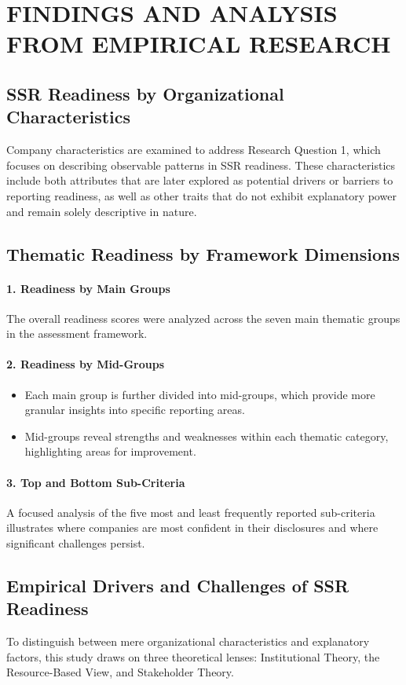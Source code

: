 \chapter{FINDINGS AND ANALYSIS FROM EMPIRICAL RESEARCH}

\section{SSR Readiness by Organizational Characteristics}
Company characteristics are examined to address Research Question 1, which focuses on describing observable patterns 
in SSR readiness. These characteristics include both attributes that are later explored as potential 
drivers or barriers to reporting readiness, as well as other traits that do not exhibit explanatory power 
and remain solely descriptive in nature.

\section{Thematic Readiness by Framework Dimensions}
\subsubsection{1. Readiness by Main Groups}
The overall readiness scores were analyzed across the seven main thematic groups in the assessment framework.

\subsubsection{2. Readiness by Mid-Groups}
\begin{itemize}
    \item Each main group is further divided into mid-groups, which provide more granular insights into specific reporting areas.
    \item Mid-groups reveal strengths and weaknesses within each thematic category, highlighting areas for improvement.
\end{itemize}

\subsubsection{3. Top and Bottom Sub-Criteria}
A focused analysis of the five most and least frequently reported sub-criteria illustrates 
where companies are most confident in their disclosures and where significant challenges persist. 

\section{Empirical Drivers and Challenges of SSR Readiness}
To distinguish between mere organizational characteristics and explanatory factors, this study 
draws on three theoretical lenses: Institutional Theory, the Resource-Based View, and Stakeholder Theory.

